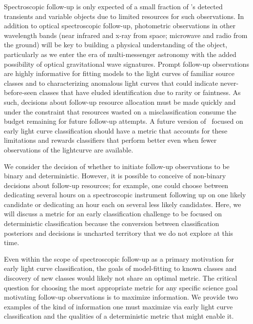Spectroscopic follow-up is only expected of a small fraction of \lsst's detected transients and variable objects due to limited resources for such observations.
In addition to optical spectroscopic follow-up, photometric observations in other wavelength bands (near infrared and x-ray from space; microwave and radio from the ground)  will be key to building a physical understanding of the object, particularly as we enter the era of multi-messenger astronomy with the added possibility of optical gravitational wave signatures.
Prompt follow-up observations are highly informative for fitting models to the light curves of familiar source classes and to characterizing anomalous light curves that could indicate never-before-seen classes that have eluded identification due to rarity or faintness.
As such, decisions about follow-up resource allocation must be made quickly and under the constraint that resources wasted on a misclassification consume the budget remaining for future follow-up attempts.
A future version of \plasticc\ focused on early light curve classification should have a metric that accounts for these limitations and rewards classifiers that perform better even when fewer observations of the lightcurve are available.

We consider the decision of whether to initiate follow-up observations to be binary and deterministic.
However, it is possible to conceive of non-binary decisions about follow-up resources; for example, one could choose between dedicating several hours on a spectroscopic instrument following up on one likely candidate or dedicating an hour each on several less likely candidates.
Here, we will discuss a metric for an early classification challenge to be focused on deterministic classification because the conversion between classification posteriors and decisions is uncharted territory that we do not explore at this time.

Even within the scope of spectroscopic follow-up as a primary motivation for early light curve classification, the goals of model-fitting to known classes and discovery of new classes would likely not share an optimal metric.
The critical question for choosing the most appropriate metric for any specific science goal motivating follow-up observations is to maximize information.
We provide two examples of the kind of information one must maximize via early light curve classification and the qualities of a deterministic metric that might enable it.

